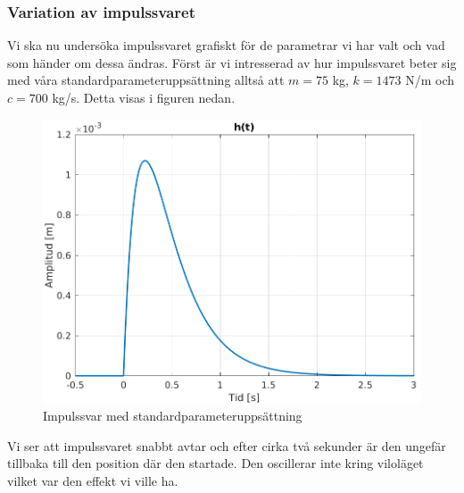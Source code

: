 \subsubsection{Variation av impulssvaret}
Vi ska nu undersöka impulssvaret grafiskt för de parametrar vi har valt och vad som händer om dessa ändras. Först är vi intresserad av hur impulssvaret beter sig med våra standardparameteruppsättning alltså att $m = 75$ kg, $k=1473$ N/m och $c=700$ kg/s. Detta visas i figuren nedan.

\begin{figure}[H]
    \centering
    \includegraphics[scale=0.9]{bilder/impulssvar}
    \caption{Impulssvar med standardparameteruppsättning}
    \label{fig:impulssvar}
\end{figure}
Vi ser att impulssvaret snabbt avtar och efter cirka två sekunder är den ungefär tillbaka till den position där den startade. Den oscillerar inte kring viloläget vilket var den effekt vi ville ha.

